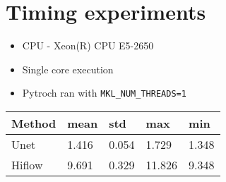 \documentclass{llncs}
\begin{document}
\section{Timing experiments}
\begin{itemize}
\item CPU - Xeon(R) CPU E5-2650
\item Single core execution
\item Pytroch ran with \texttt{MKL\_NUM\_THREADS=1}
\end{itemize}

\begin{center}

  \begin{tabular}{@{}p{2cm}|p{1.5cm}p{1.5cm}p{1.5cm}p{1.5cm}@{}}
    \toprule
    Method & mean & std & max & min \\
    \midrule
    Unet & 1.416 & 0.054 & 1.729 & 1.348 \\[1ex]
    Hiflow & 9.691 & 0.329  & 11.826 & 9.348 \\[1ex]
    \bottomrule
  \end{tabular}
\end{center}
\end{document}
